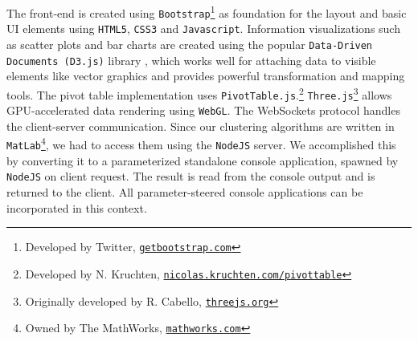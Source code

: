 \documentclass[journal]{style/vgtc} 			          %
\begin{document}
The front-end is created using \texttt{Bootstrap}\footnote{Developed by Twitter, \href{http://getbootstrap.com}{\texttt{getbootstrap.com}}} as foundation for the layout and basic UI elements using \texttt{HTML5}, \texttt{CSS3} and \texttt{Javascript}.
%
Information visualizations such as scatter plots and bar charts are created using the popular \texttt{Data-Driven Documents (D3.js)} library \cite{D3}, which works well for attaching data to visible elements like vector graphics and provides powerful transformation and mapping tools.
%
The pivot table implementation uses \texttt{PivotTable.js}.\footnote{Developed by N. Kruchten, \href{http://nicolas.kruchten.com/pivottable}{\texttt{nicolas.kruchten.com/pivottable}}}
%
\texttt{Three.js}\footnote{Originally developed by R. Cabello, \href{http://threejs.org}{\texttt{threejs.org}}} allows GPU-accelerated data rendering using \texttt{WebGL}.
%
The WebSockets protocol handles the client-server communication. 
%
Since our clustering algorithms are written in \texttt{MatLab}\footnote{Owned by The MathWorks, \href{http://mathworks.com}{\texttt{mathworks.com}}}, we had to access them using the \texttt{NodeJS} server.
%
We accomplished this by converting it to a parameterized standalone console application, spawned by \texttt{NodeJS} on client request.
%
The result is read from the console output and is returned to the client.
%
All parameter-steered console applications can be incorporated in this context.
%
\end{document}
